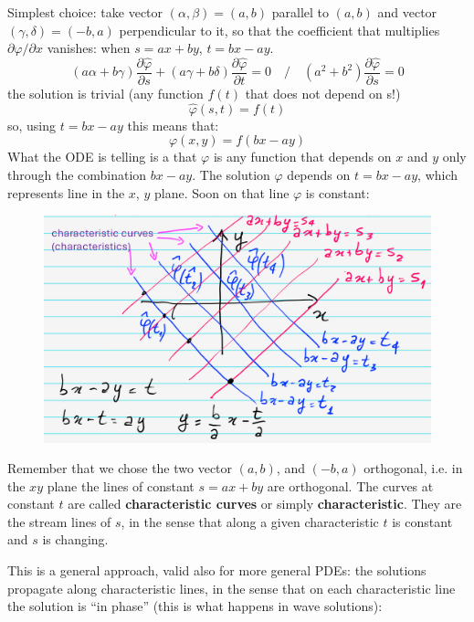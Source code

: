 \documentclass{article}
\begin{document}
\vspace{2mm}\noindent
Simplest choice: take vector $(\alpha, \beta) = (a, b)$ parallel to $(a,b)$ and vector $(\gamma, \delta) = (-b, a)$ perpendicular to it, so that the coefficient that multiplies $\partial \varphi/ \partial x$ vanishes: when $s = ax + by$, $t = bx - ay$.
\begin{equation}
    \left( a\alpha + b\gamma \right) \frac{\partial \hat{\varphi}}{\partial s}
+ \left( a\gamma + b\delta \right) \frac{\partial \hat{\varphi}}{\partial t} = 0 \quad / \quad (a^2 + b^2 ) \frac{\partial \hat{\varphi}}{\partial s} = 0
\end{equation}
the solution is trivial (any function $f(t)$ that does not depend on s!)
\begin{equation}
    \hat{\varphi} (s,t) = f(t)
\end{equation}
so, using $t = bx-ay$ this means that:
\begin{equation}
\varphi(x, y) = f(bx-ay)
\end{equation}
What the ODE is telling is a that $\varphi$ is any function that depends on $x$ and $y$ only through the combination $bx-ay$. The solution $\varphi$ depends on $t = bx-ay$, which represents line in the $x$, $y$ plane. Soon on that line $\varphi$ is constant:

\begin{figure}[h]
    \centering
    \includegraphics[width=0.5\linewidth]{fig51.jpeg}
\end{figure}

\newpage

\noindent
Remember that we chose the two vector $(a, b)$, and $(-b,a)$ orthogonal, i.e. in the $xy$ plane the lines of constant $s=ax+by$ are orthogonal. The curves at constant $t$ are called \textbf{characteristic curves} or simply \textbf{characteristic}. They are the stream lines of $s$, in the sense that along a given characteristic $t$ is constant and $s$ is changing. 

\noindent
This is a general approach, valid also for more general PDEs: the solutions propagate along characteristic lines, in the sense that on each characteristic line the solution is “in phase” (this is what happens in wave solutions): 
\end{document}

